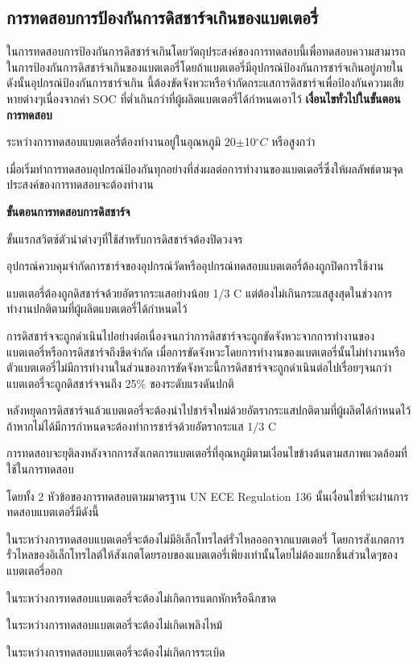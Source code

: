 \subsection{การทดสอบการป้องกันการดิสชาร์จเกินของแบตเตอรี่}
ในการทดสอบการป้องกันการดิสชาร์จเกินโดยวัตถุประสงค์ของการทดสอบนี้เพื่อทดสอบความสามารถในการป้องกันการดิสชาร์จเกินของแบตเตอรี่โดยถ้าแบตเตอรี่มีอุปกรณ์ป้องกันการชาร์จเกินอยู่ภายในดังนั้นอุปกรณ์ป้องกันการชาร์จเกิน
นี้ต้องขัดจังหวะหรือจำกัดกระแสการดิสชาร์จเพื่อป้องกันความเสียหายต่างๆเนื่องจากค่า SOC ที่ต่ำเกินกว่าที่ผู้ผลิตแบตเตอรี่ได้กำหนดเอาไว้
\newline
\newline
\textbf{เงื่อนไขทั่วไปในขั้นตอนการทดสอบ}
\begin{itemize}
{\item ระหว่างการทดสอบแบตเตอรี่ต้องทำงานอยู่ในอุณหภูมิ 20$\pm$10$^{\circ}C$ หรือสูงกว่า}
{\item เมื่อเริ่มทำการทดสอบอุปกรณ์ป้องกันทุกอย่างที่ส่งผลต่อการทำงานของแบตเตอรี่ซึ่งให้ผลลัพธ์ตามจุดประสงค์ของการทดสอบจะต้องทำงาน}
\end{itemize}
\textbf{ขั้นตอนการทดสอบการดิสชาร์จ}
\begin{itemize}
{\item ขั้นแรกสวิตซ์ตัวนำต่างๆที่ใช้สำหรับการดิสชาร์จต้องปิดวงจร}
{\item อุปกรณ์ควบคุมจำกัดการชาร์จของอุปกรณ์วัดหรืออุปกรณ์ทดสอบแบตเตอรี่ต้องถูกปิดการใช้งาน}
{\item แบตเตอรี่ต้องถูกดิสชาร์จด้วยอัตรากระแสอย่างน้อย 1/3 C แต่ต้องไม่เกินกระแสสูงสุดในช่วงการทำงานปกติตามที่ผู้ผลิตแบตเตอรี่ได้กำหนดไว้}
{\item การดิสชาร์จจะถูกดำเนินไปอย่างต่อเนื่องจนกว่าการดิสชาร์จจะถูกขัดจังหวะจากการทำงานของแบตเตอรี่หรือการดิสชาร์จถึงขีดจำกัด เมื่อการขัดจังหวะโดยการทำงานของแบตเตอรี่นั้นไม่ทำงานหรือตัวแบตเตอรี่ไม่มีการทำงานในส่วนของการขัดจังหวะนี้การดิสชาร์จจะถูกดำเนินต่อไปเรื่อยๆจนกว่าแบตเตอรี่จะถูกดิสชาร์จจนถึง 25\% ของระดับแรงดันปกติ}
{\item หลังหยุดการดิสชาร์จแล้วแบตเตอรี่จะต้องนำไปชาร์จใหม่ด้วยอัตรากระแสปกติตามที่ผู้ผลิตได้กำหนดไว้ถ้าหากไม่ได้มีการกำหนดจะต้องทำการชาร์จด้วยอัตรากระแส 1/3 C}
{\item การทดสอบจะยุติลงหลังจากการสังเกตการแบตเตอรี่ที่อุณหภูมิตามเงื่อนไขข้างต้นตามสภาพแวดล้อมที่ใช้ในการทดสอบ}
\end{itemize}
โดยทั้ง 2 หัวข้อของการทดสอบตามมาตรฐาน UN ECE Regulation 136 นั้นเงื่อนไขที่จะผ่านการทดสอบแบตเตอรี่มีดังนี้
\begin{enumerate}
{\item ในระหว่างการทดสอบแบตเตอรี่จะต้องไม่มีอิเล็กโทรไลต์รั่วไหลออกจากแบตเตอรี่ โดยการสังเกตการรั่วไหลของอิเล็กโทรไลต์ให้สังเกตโดยรอบของแบตเตอรี่เพียงเท่านั้นโดยไม่ต้องแยกชิ้นส่วนใดๆของแบตเตอรี่ออก}
{\item ในระหว่างการทดสอบแบตเตอรี่จะต้องไม่เกิดการแตกหักหรือฉีกขาด}
{\item ในระหว่างการทดสอบแบตเตอรี่จะต้องไม่เกิดเพลิงไหม้}
{\item ในระหว่างการทดสอบแบตเตอรี่จะต้องไม่เกิดการระเบิด}
\end{enumerate}
